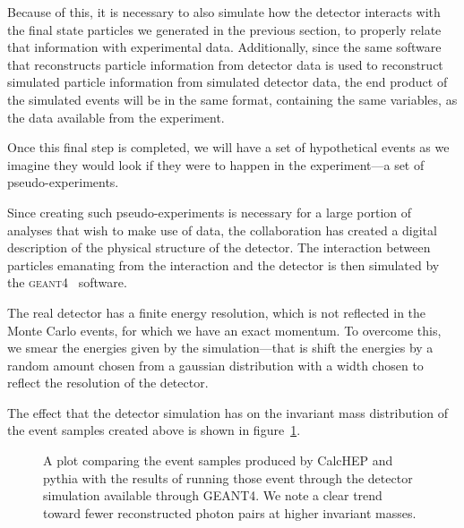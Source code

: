 Because of this, it is necessary to also simulate how the detector interacts with the final state particles we generated in the previous section, to properly relate that information with experimental data. Additionally, since the same software that reconstructs particle information from detector data is used to reconstruct simulated particle information from simulated detector data, the end product of the simulated events will be in the same format, containing the same variables, as the data available from the experiment.

Once this final step is completed, we will have a set of hypothetical events as we imagine they would look if they were to happen in the experiment---a set of pseudo-experiments.

Since creating such pseudo-experiments is necessary for a large portion of analyses that wish to make use of \atlas{} data, the \atlas{} collaboration has created a digital description of the physical structure of the \atlas{} detector. The interaction between particles emanating from the interaction and the detector is then simulated by the \textsc{geant}4~\cite{geant4} software.

The real detector has a finite energy resolution, which is not reflected in the Monte Carlo events, for which we have an exact momentum. To overcome this, we smear the energies given by the simulation---that is shift the energies by a random amount chosen from a gaussian distribution with a width chosen to reflect the resolution of the detector.

The effect that the detector simulation has on the invariant mass distribution of the event samples created above is shown in figure~\ref{geant-beaf}.

\begin{figure}[htp]
\begin{minipage}[b]{.69\textwidth}
\begin{infilsf} \tiny

\end{infilsf}
\end{minipage}
\hfill\begin{minipage}[b]{.3\textwidth}
\caption{A plot comparing the event samples produced by CalcHEP and pythia with the results of running those event through the detector simulation available through GEANT4. We note a clear trend toward fewer reconstructed photon pairs at higher invariant masses. \label{geant-beaf}}
\end{minipage}
\end{figure}

